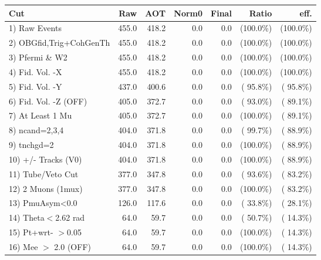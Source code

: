  \begin{table}[h!]\centering
 \begin{tabular}{||l||r|r|r|r|r|r||}
 \hline
 \hline
 Cut & Raw & AOT & Norm0 & Final & Ratio & eff.       \\
 \hline
  1) Raw Events           &        455.0 &        418.2 &          0.0 &          0.0 & (100.0\%) & (100.0\%) \\
  2) OBGfid,Trig+CohGenTh &        455.0 &        418.2 &          0.0 &          0.0 & (100.0\%) & (100.0\%) \\
  3) Pfermi \& W2         &        455.0 &        418.2 &          0.0 &          0.0 & (100.0\%) & (100.0\%) \\
  4) Fid. Vol. -X         &        455.0 &        418.2 &          0.0 &          0.0 & (100.0\%) & (100.0\%) \\
  5) Fid. Vol. -Y         &        437.0 &        400.6 &          0.0 &          0.0 & ( 95.8\%) & ( 95.8\%) \\
  6) Fid. Vol. -Z (OFF)   &        405.0 &        372.7 &          0.0 &          0.0 & ( 93.0\%) & ( 89.1\%) \\
  7) At Least 1 Mu        &        405.0 &        372.7 &          0.0 &          0.0 & (100.0\%) & ( 89.1\%) \\
  8) ncand=2,3,4          &        404.0 &        371.8 &          0.0 &          0.0 & ( 99.7\%) & ( 88.9\%) \\
  9) tnchgd=2             &        404.0 &        371.8 &          0.0 &          0.0 & (100.0\%) & ( 88.9\%) \\
 10) +/- Tracks (V0)      &        404.0 &        371.8 &          0.0 &          0.0 & (100.0\%) & ( 88.9\%) \\
 11) Tube/Veto Cut        &        377.0 &        347.8 &          0.0 &          0.0 & ( 93.6\%) & ( 83.2\%) \\
 12) 2 Muons (1mux)       &        377.0 &        347.8 &          0.0 &          0.0 & (100.0\%) & ( 83.2\%) \\
 13) PmuAsym<0.0          &        126.0 &        117.6 &          0.0 &          0.0 & ( 33.8\%) & ( 28.1\%) \\
 14) Theta$<$2.62 rad     &         64.0 &         59.7 &          0.0 &          0.0 & ( 50.7\%) & ( 14.3\%) \\
 15) Pt+wrt- $>$0.05      &         64.0 &         59.7 &          0.0 &          0.0 & (100.0\%) & ( 14.3\%) \\
 16) Mee $>$ 2.0  (OFF)   &         64.0 &         59.7 &          0.0 &          0.0 & (100.0\%) & ( 14.3\%) \\

\end{tabular}
\end{table}
